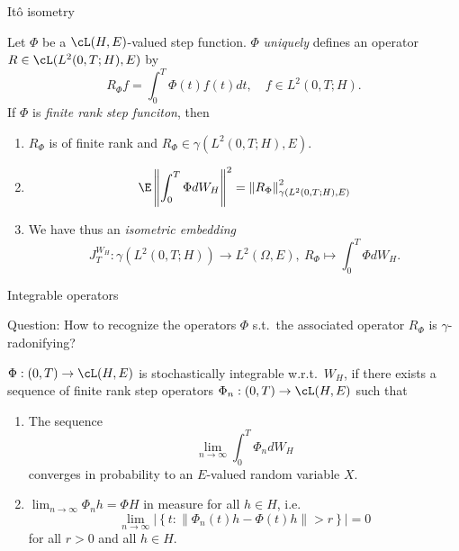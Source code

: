 \begin{frame}
    {It\^o isometry}
    
    Let $\Phi$ be a  $\cL(H,E)$-valued step function. $\Phi$ \emph{uniquely} defines
    an operator $R \in \cL ( L^2(0,T; H), E)$ by
    \begin{equation*}
        R_\Phi f = \int_{0}^{T} \Phi(t) f(t) dt, \quad f \in L^2(0,T; H).
    \end{equation*}
    If $\Phi$ is \emph{finite rank step funciton}, then
    \begin{enumerate}
        \item $R_\Phi$ is of finite rank and $R_\Phi \in\gamma(L^2(0,T;H),E)$. 
        \item \begin{equation*}
                \E \left\| \int_{0}^{T} \Phi d W_H  \right\|^2 = 
                \left\| R_\Phi \right\|^2_{\gamma ( L^2(0,T; H),E  )}
            \end{equation*}
        \item We have thus an \emph{isometric embedding} 
            \begin{equation*}
                J_T^{W_H}: 
                \gamma(L^2(0,T; H)) \to L^2(\Omega,E), \ 
                R_\Phi \mapsto \int_{0}^{T} \Phi d W_H.
            \end{equation*}
    \end{enumerate}
\end{frame}


\begin{frame}
    {Integrable operators}

    Question: How to recognize the operators $\Phi$ s.t.\ the associated
    operator $R_\Phi$ is $\gamma$-radonifying?  
    
    \begin{definition}
        $\Phi : (0,T) \to \cL(H,E)$ is stochastically integrable w.r.t.\ $W_H$, if
        there exists a sequence of finite rank step operators 
        $\Phi_n : (0,T) \to \cL(H,E)$ such that
        \begin{enumerate}
            \item The sequence \begin{equation*}
                    \lim_{n\to \infty} \int_{0}^{T} \Phi_n d W_H 
                \end{equation*}
                converges in probability to an $E$-valued random variable $X$. 
            \item $\lim_{n\to \infty} \Phi_n h = \Phi H$ in measure for all $h\in H$, i.e.
                \begin{equation*}
                    \lim_{n\to \infty} | 
                    \left\{ t : \left\| \Phi_n (t) h - \Phi(t) h \right\|>r \right\}  | =0 
                \end{equation*}
                for all $r>0$ and all $h\in H$. 
        \end{enumerate}
        
    \end{definition}


\end{frame}



